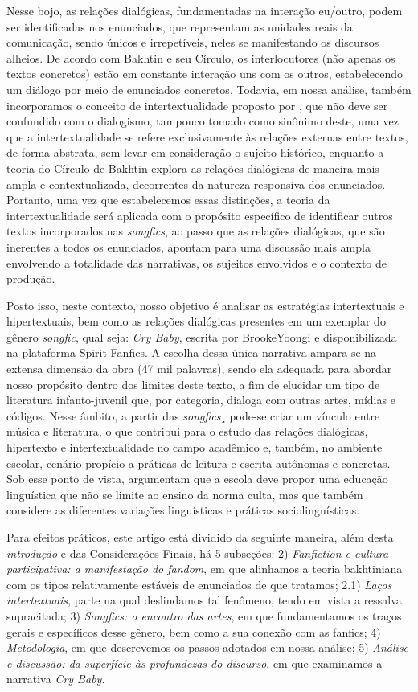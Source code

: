 Nesse bojo, as relações dialógicas, fundamentadas na interação eu/outro,
podem ser identificadas nos enunciados, que representam as unidades
reais da comunicação, sendo únicos e irrepetíveis, neles se manifestando
os discursos alheios. De acordo com Bakhtin e seu Círculo, os
interlocutores (não apenas os textos concretos) estão em constante
interação uns com os outros, estabelecendo um diálogo por meio de
enunciados concretos. Todavia, em nossa análise, também incorporamos o
conceito de intertextualidade proposto por \textcite{kristeva2005}, que não deve
ser confundido com o dialogismo, tampouco tomado como sinônimo deste,
uma vez que a intertextualidade se refere exclusivamente às relações
externas entre textos, de forma abstrata, sem levar em consideração o
sujeito histórico, enquanto a teoria do Círculo de Bakhtin explora as
relações dialógicas de maneira mais ampla e contextualizada, decorrentes
da natureza responsiva dos enunciados. Portanto, uma vez que
estabelecemos essas distinções, a teoria da intertextualidade será
aplicada com o propósito específico de identificar outros textos
incorporados nas \emph{songfics}, ao passo que as relações dialógicas,
que são inerentes a todos os enunciados, apontam para uma discussão mais
ampla envolvendo a totalidade das narrativas, os sujeitos envolvidos e o
contexto de produção.

Posto isso, neste contexto, nosso objetivo é analisar as estratégias
intertextuais e hipertextuais, bem como as relações dialógicas presentes
em um exemplar do gênero \emph{songfic}, qual seja: \emph{Cry Baby},
escrita por BrookeYoongi e disponibilizada na plataforma Spirit Fanfics.
A escolha dessa única narrativa ampara-se na extensa dimensão da obra
(47 mil palavras), sendo ela adequada para abordar nosso propósito
dentro dos limites deste texto, a fim de elucidar um tipo de literatura
infanto-juvenil que, por categoria, dialoga com outras artes, mídias e
códigos. Nesse âmbito, a partir das \emph{songfics}¸ pode-se criar um
vínculo entre música e literatura, o que contribui para o estudo das
relações dialógicas, hipertexto e intertextualidade no campo acadêmico
e, também, no ambiente escolar, cenário propício a práticas de leitura e
escrita autônomas e concretas. Sob esse ponto de vista, \textcite{bandoli_por_2015} argumentam que a escola deve propor uma educação linguística que
não se limite ao ensino da norma culta, mas que também considere as
diferentes variações linguísticas e práticas sociolinguísticas.

Para efeitos práticos, este artigo está dividido da seguinte maneira,
além desta \emph{introdução} e das Considerações Finais, há 5 subseções:
2) \emph{Fanfiction e cultura participativa: a manifestação do fandom},
em que alinhamos a teoria bakhtiniana com os tipos relativamente
estáveis de enunciados de que tratamos; 2.1) \emph{Laços intertextuais},
parte na qual deslindamos tal fenômeno, tendo em vista a ressalva
supracitada; 3) \emph{Songfics: o encontro das artes}, em que
fundamentamos os traços gerais e específicos desse gênero, bem como a
sua conexão com as fanfics; 4) \emph{Metodologia}, em que descrevemos os
passos adotados em nossa análise; 5) \emph{Análise e discussão: da
superfície às profundezas do discurso}, em que examinamos a narrativa
\emph{Cry Baby}.